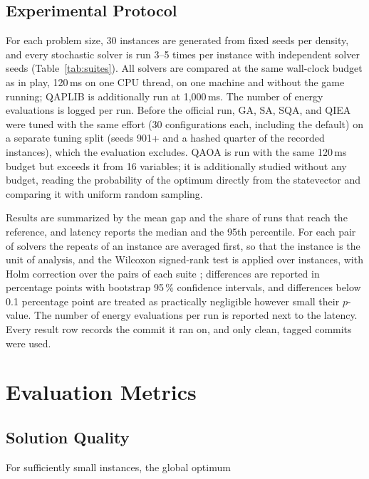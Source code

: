 \documentclass[12pt, a4paper]{article}
\begin{document}
\subsection*{Experimental Protocol}

For each problem size, 30 instances are generated from fixed seeds per density, and every stochastic solver is run 3--5 times per instance with independent solver seeds (Table~\ref{tab:suites}). All solvers are compared at the same wall-clock budget as in play, 120\,ms on one CPU thread, on one machine and without the game running; QAPLIB is additionally run at 1{,}000\,ms. The number of energy evaluations is logged per run. Before the official run, GA, SA, SQA, and QIEA were tuned with the same effort (30 configurations each, including the default) on a separate tuning split (seeds 901+ and a hashed quarter of the recorded instances), which the evaluation excludes. QAOA is run with the same 120\,ms budget but exceeds it from 16 variables; it is additionally studied without any budget, reading the probability of the optimum directly from the statevector and comparing it with uniform random sampling.

Results are summarized by the mean gap and the share of runs that reach the reference, and latency reports the median and the 95th percentile. For each pair of solvers the repeats of an instance are averaged first, so that the instance is the unit of analysis, and the Wilcoxon signed-rank test is applied over instances, with Holm correction over the pairs of each suite \cite{Holm1979}; differences are reported in percentage points with bootstrap 95\,\% confidence intervals, and differences below 0.1 percentage point are treated as practically negligible however small their $p$-value. The number of energy evaluations per run is reported next to the latency. Every result row records the commit it ran on, and only clean, tagged commits were used.

\section*{Evaluation Metrics}

\subsection*{Solution Quality}

For sufficiently small instances, the global optimum
\end{document}
